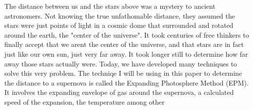 The distance between us and the stars above was a mystery to ancient 
astronomers. Not knowing the true unfathomable distance, they assumed
the stars were just points of light in a cosmic dome that surrounded
and rotated around the earth, the "center of the universe". It took 
centuries of free thinkers to finally accept that we arent the center 
of the universe, and that stars are in fact just like our own sun, just 
very far away. It took longer still to determine how far away those stars
actually were. Today, we have developed many techniques to solve this very 
problem. The techniqe I will be using in this paper to determine the distance
to a supernova is called the Expanding Photosphere Method (EPM). It involves the 
expanding envelope of gas around the supernova, a calculated speed of the
expansion, the temperature among other
